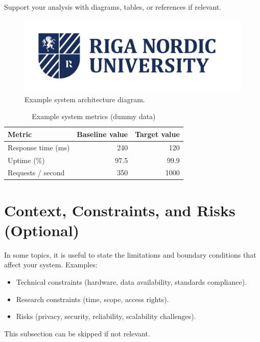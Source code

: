 Support your analysis with diagrams, tables, or references if relevant.

\begin{figure}[h]
  \centering
  \includegraphics[width=0.65\linewidth]{b_chapters/chapter1/assets/RNU_large_logo.png}
  \caption{Example system architecture diagram.}
  \label{fig:analysis-example}
\end{figure}

{\singlespacing
\begin{table}[h]
  \caption{Example system metrics (dummy data)}
  \label{tab:analysis-example}
  \centering
  \begin{tabular}{lrr}
    \toprule
    Metric & Baseline value & Target value \\
    \midrule
    Response time (ms)  & 240   & 120   \\
    Uptime (\%)         & 97.5  & 99.9  \\
    Requests / second   & 350   & 1000  \\
    \bottomrule
  \end{tabular}
\end{table}
}

\section{Context, Constraints, and Risks (Optional)}
\label{sec:constraints}
In some topics, it is useful to state the limitations and boundary conditions that affect your system. Examples:

\begin{itemize}[leftmargin=1.2cm]
  \item Technical constraints (hardware, data availability, standards compliance).
  \item Research constraints (time, scope, access rights).
  \item Risks (privacy, security, reliability, scalability challenges).
\end{itemize}

This subsection can be skipped if not relevant.

